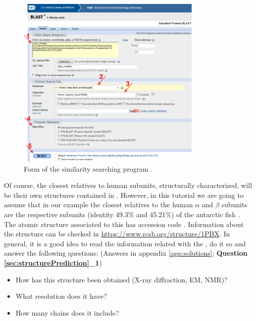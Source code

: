   \begin{figure}[H]
  \centering 
  \captionsetup{width=.7\linewidth} 
  \includegraphics[width=0.80\textwidth]{Images/Fig9}
  \caption{Form of the similarity searching program .}
  \label{fig:blastp}
  \end{figure}
  
  Of course, the closest relatives to human  subunits, structurally characterized, will be their own structures contained in . However, in this tutorial we are going to assume that in our example the closest relatives to the human  $\alpha$ and $\beta$ subunits are the respective  subunits (identity 49.3\% and 45.21\%) of the antarctic fish  \citep{camardella1992}. The atomic structure associated to this  has  accession code . Information about the structure can be checked in \url{https://www.rcsb.org/structure/1PBX}. In general, it is a good idea to read the information related with the , do it so and answer the following questions: (Answers in appendix \ref{app:solutions}; \textbf{Question \ref{sec:structurePrediction}\_1})
  
  \begin{minipage}{\linewidth}
    \begin{framed}
      \begin{itemize}
        \item How has this structure been obtained (X-ray diffraction, EM, NMR)?
        \item What resolution does it have?
        \item How many chains does it include?
      \end{itemize}
    \end{framed}
  \end{minipage}
